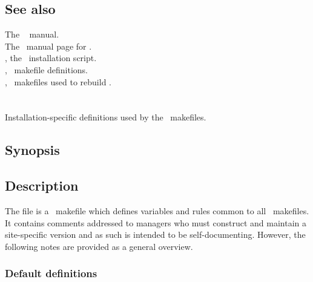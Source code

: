 \subsection*{See also}

The \gnu\  manual.\\
The \gnu\ manual page for .\\
, the \aipspp\ installation script.\\
, \aipspp\ makefile definitions.\\
, \gnu\ makefiles used to rebuild \aipspp.
 

\newpage
\section{}
\label{makedefs}



Installation-specific definitions used by the \aipspp\ makefiles.

\subsection*{Synopsis}

\begin{synopsis}
\end{synopsis}

\subsection*{Description}

The  file is a \gnu\ makefile which defines variables and rules
common to all \aipspp\ makefiles.  It contains comments addressed to \aipspp
managers who must construct and maintain a site-specific version and as such
is intended to be self-documenting.  However, the following notes are provided
as a general overview.

\subsubsection*{Default definitions}

